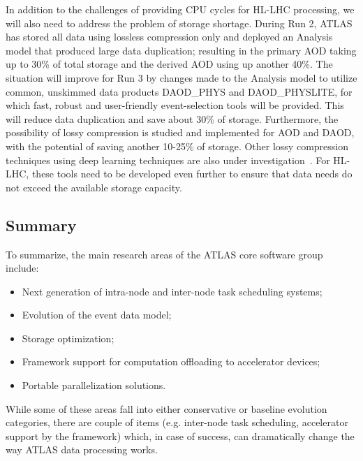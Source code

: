 In addition to the challenges of providing CPU cycles for HL-LHC processing, we will also need to address the problem of storage shortage. During Run 2, ATLAS has stored all data using lossless compression only and deployed an Analysis model that produced large data duplication; resulting in the primary AOD taking up to 30\% of total storage and the derived AOD using up another 40\%. The situation will improve for Run 3 by changes made to the Analysis model to utilize common, unskimmed data products DAOD\_PHYS and DAOD\_PHYSLITE, for which fast, robust and user-friendly event-selection tools will be provided. This will reduce data duplication and save about 30\% of storage. Furthermore, the possibility of lossy compression is studied and implemented for AOD and DAOD, with the potential of saving another 10-25\% of storage. Other lossy compression techniques using deep learning techniques are also under investigation~\cite{CompressionThesis}.  For HL-LHC, these tools need to be developed even further to ensure that data needs do not exceed the available storage capacity. 

\subsection{Summary}

To summarize, the main research areas of the ATLAS core software group include:
\begin{itemize}
    \item Next generation of intra-node and inter-node task scheduling systems;
    \item Evolution of the event data model;
    \item Storage optimization;
    \item Framework support for computation offloading to accelerator devices;
    \item Portable parallelization solutions.
\end{itemize}

While some of these areas fall into either conservative or baseline evolution categories, there are couple of items (e.g. inter-node task scheduling, accelerator support by the framework) which, in case of success, can dramatically change the way ATLAS data processing works.